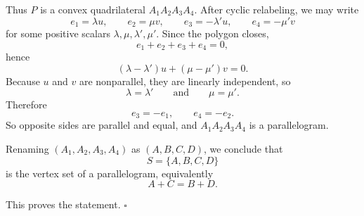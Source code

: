 Thus \(P\) is a convex quadrilateral \(A_1A_2A_3A_4\). After cyclic relabeling, we may write
\[
e_1=\lambda u,\qquad
e_2=\mu v,\qquad
e_3=-\lambda' u,\qquad
e_4=-\mu' v
\]
for some positive scalars \(\lambda,\mu,\lambda',\mu'\). Since the polygon closes,
\[
e_1+e_2+e_3+e_4=0,
\]
hence
\[
(\lambda-\lambda')u+(\mu-\mu')v=0.
\]
Because \(u\) and \(v\) are nonparallel, they are linearly independent, so
\[
\lambda=\lambda'
\qquad\text{and}\qquad
\mu=\mu'.
\]
Therefore
\[
e_3=-e_1,\qquad e_4=-e_2.
\]
So opposite sides are parallel and equal, and \(A_1A_2A_3A_4\) is a parallelogram.

Renaming \((A_1,A_2,A_3,A_4)\) as \((A,B,C,D)\), we conclude that
\[
S=\{A,B,C,D\}
\]
is the vertex set of a parallelogram, equivalently
\[
A+C=B+D.
\]

This proves the statement. \(\square\)